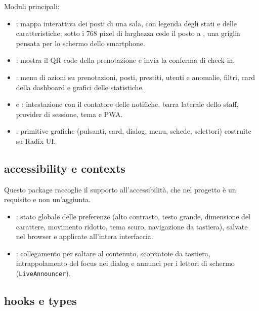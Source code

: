 \documentclass[11pt,a4paper,oneside,openany]{book}
\begin{document}
Moduli principali:
\begin{itemize}
  \item {}: mappa interattiva dei posti di una sala,
        con legenda degli stati e delle caratteristiche; sotto i 768 pixel di
        larghezza cede il posto a , una griglia
        pensata per lo schermo dello smartphone.
  \item {}: mostra il QR code della prenotazione e
        invia la conferma di check-in.
  \item {}: menu di azioni su prenotazioni, posti, prestiti,
        utenti e anomalie, filtri, card della dashboard e grafici delle
        statistiche.
  \item {} e : intestazione con il contatore
        delle notifiche, barra laterale dello staff, provider di sessione, tema
        e PWA.
  \item {}: primitive grafiche (pulsanti, card, dialog, menu, schede,
        selettori) costruite su Radix UI.
\end{itemize}


\subsection{accessibility e contexts}

Questo package raccoglie il supporto all'accessibilità, che nel progetto è un
requisito e non un'aggiunta.
\begin{itemize}
  \item {}: stato globale delle
        preferenze (alto contrasto, testo grande, dimensione del carattere,
        movimento ridotto, tema scuro, navigazione da tastiera), salvate nel
        browser e applicate all'intera interfaccia.
  \item {}: collegamento per saltare al
        contenuto, scorciatoie da tastiera, intrappolamento del focus nei
        dialog e annunci per i lettori di schermo (\texttt{LiveAnnouncer}).
\end{itemize}

\subsection{hooks e types}
\end{document}
